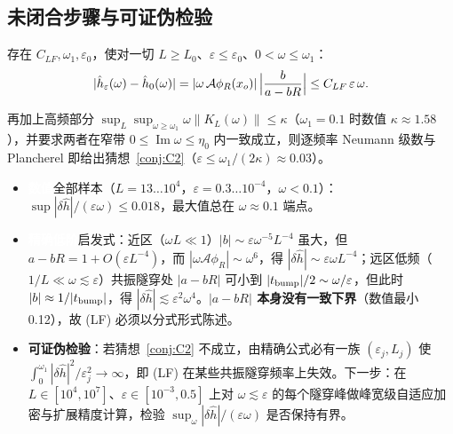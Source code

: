 \documentclass[11pt,a4paper,fontset=windows]{ctexart}
\newcommand{\tagbox}[2]{\begingroup\setlength{\fboxsep}{1.4pt}\colorbox{#1}{\textcolor{white}{\footnotesize\bfseries #2}}\endgroup}
\newcommand{\exactlow}{\tagbox{violet!80!black}{精确低阶}}
\newcommand{\numer}{\tagbox{orange!85!black}{数值}}
\newcommand{\conj}{\tagbox{red!70!black}{猜想}}
\theoremstyle{definition}
\theoremstyle{definition}
\newcommand{\eps}{\varepsilon}
\newcommand{\cA}{\mathcal A}
\renewcommand{\Im}{\operatorname{Im}}
\begin{document}
\subsection{未闭合步骤与可证伪检验}
\begin{tcolorbox}[keybox,colframe=red!55!black,colback=red!2,title={卡住的精确引理 (LF)\ \conj}]
存在 $C_{LF},\omega_1,\eps_0$，使对一切 $L\ge L_0$、$\eps\le\eps_0$、$0<\omega\le\omega_1$：
\[
|\hat h_\eps(\omega)-\hat h_0(\omega)|=|\omega\,\cA\phi_R(x_o)|\,\Bigl|\frac{b}{a-bR}\Bigr|\le C_{LF}\,\eps\,\omega .
\]
\end{tcolorbox}
再加上高频部分 $\sup_L\sup_{\omega\ge\omega_1}\omega\|K_L(\omega)\|\le\kappa$（$\omega_1=0.1$ 时数值 $\kappa\approx1.58$），并要求两者在窄带 $0\le\Im\omega\le\eta_0$ 内一致成立，则逐频率 Neumann 级数与 Plancherel 即给出猜想~\ref{conj:C2}（$\eps\le\omega_1/(2\kappa)\approx0.03$）。
\begin{itemize}
\item \numer\enspace 全部样本（$L=13\ldots10^4$，$\eps=0.3\ldots10^{-4}$，$\omega<0.1$）：$\sup|\delta\hat h|/(\eps\omega)\le0.018$，最大值总在 $\omega\approx0.1$ 端点。
\item \exactlow\enspace 启发式：近区（$\omega L\ll1$）$|b|\sim\eps\omega^{-5}L^{-4}$ 虽大，但 $a-bR=1+O(\eps L^{-4})$，而 $|\omega\cA\phi_R|\sim\omega^6$，得 $|\delta\hat h|\sim\eps\omega L^{-4}$；远区低频（$1/L\ll\omega\lesssim\eps$）共振隧穿处 $|a-bR|$ 可小到 $|t_{\rm bump}|/2\sim\omega/\eps$，但此时 $|b|\approx1/|t_{\rm bump}|$，得 $|\delta\hat h|\lesssim\eps^2\omega^4$。\textbf{$|a-bR|$ 本身没有一致下界}（数值最小 0.12），故 (LF) 必须以分式形式陈述。
\item \textbf{可证伪检验}：若猜想~\ref{conj:C2} 不成立，由精确公式必有一族 $(\eps_j,L_j)$ 使 $\int_0^{\omega_1}|\delta\hat h|^2/\eps_j^2\to\infty$，即 (LF) 在某些共振隧穿频率上失效。下一步：在 $L\in[10^4,10^7]$、$\eps\in[10^{-3},0.5]$ 上对 $\omega\lesssim\eps$ 的每个隧穿峰做峰宽级自适应加密与扩展精度计算，检验 $\sup_\omega|\delta\hat h|/(\eps\omega)$ 是否保持有界。
\end{itemize}

\end{document}
